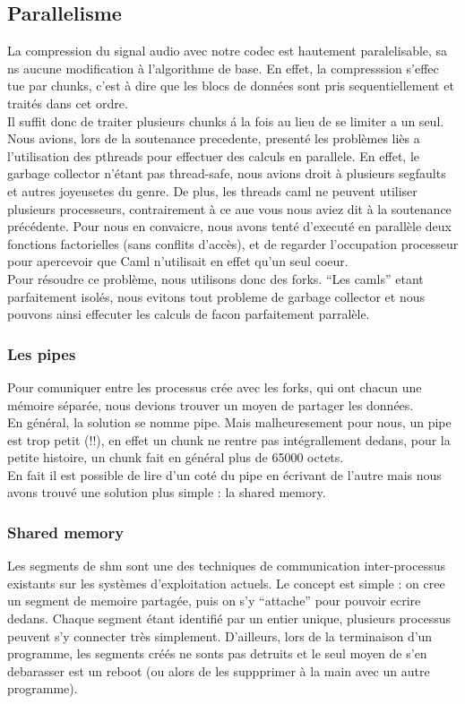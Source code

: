 \documentclass[a4paper,12pt]{article}
\begin{document}
	\subsection{Parallelisme}
La compression du signal audio avec notre codec est hautement paralelisable, sa
ns aucune modification \`a l'algorithme de base. En effet, la compresssion s'effec
tue par chunks, c'est \`a dire que les blocs de donn\'ees sont pris sequentiellement
 et trait\'es dans cet ordre.\\
Il suffit donc de traiter plusieurs chunks \'a la fois au lieu de se limiter a un 
seul.\\
Nous avions, lors de la soutenance precedente, present\'e les probl\`emes li\`es a l'utilisation des pthreads pour effectuer des calculs en parallele. En effet, le garbage collector n'\'etant pas thread-safe, nous avions droit \`a plusieurs segfaults et autres joyeusetes du genre. De plus, les threads caml ne peuvent utiliser
plusieurs processeurs, contrairement \`a ce aue vous nous aviez dit \`a la soutenance
pr\'ec\'edente. Pour nous en convaicre, nous avons tent\'e d'execut\'e en parall\`ele
deux fonctions factorielles (sans conflits d'acc\`es), et de regarder l'occupation
processeur pour apercevoir que Caml n'utilisait en effet qu'un seul coeur.\\
Pour r\'esoudre ce probl\`eme, nous utilisons donc des forks.
``Les camls'' etant parfaitement isol\'es, nous evitons tout probleme de garbage collector et nous pouvons ainsi effecuter les calculs de facon parfaitement parral\`ele.
		\subsubsection{Les pipes}
Pour comuniquer entre les processus cr\'ee avec les forks, qui ont chacun une m\'emoire s\'epar\'ee, nous devions trouver un moyen de partager les donn\'ees.\\
En g\'en\'eral, la solution se nomme pipe. Mais malheuresement pour nous, un pipe est trop petit (!!), en effet un chunk ne rentre pas int\'egrallement dedans, pour la petite histoire, un chunk fait en g\'en\'eral plus de 65000 octets.\\
En fait il est possible de lire d'un cot\'e du pipe en \'ecrivant de l'autre mais nous avons trouv\'e une solution plus simple : la shared memory.
		\subsubsection{Shared memory}
Les segments de shm sont une des techniques de communication inter-processus existants sur les syst\`emes d'exploitation actuels. Le concept est simple :  on cree un segment de memoire partag\'ee, puis on s'y ``attache'' pour pouvoir ecrire dedans. Chaque segment \'etant identifi\'e par un entier unique, plusieurs processus peuvent s'y connecter tr\`es simplement. D'ailleurs, lors de la terminaison d'un programme, les segments cr\'e\'es ne sonts pas detruits et le seul moyen de s'en debarasser est un reboot (ou alors de les suppprimer \`a la main avec un autre programme).
\end{document}
